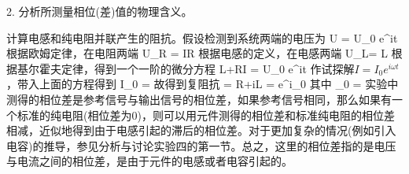 \documentclass[11pt,a4paper]{ctexart}
\begin{document}
2. 分析所测量相位(差)值的物理含义。

计算电感和纯电阻并联产生的阻抗。假设检测到系统两端的电压为
\beq
U = U_0 e^{i\omega t}
\eeq
根据欧姆定律，在电阻两端
\beq
U_R = IR
\eeq
根据电感的定义，在电感两端
\beq
U_L=  L 
\eeq
根据基尔霍夫定律，得到一个一阶的微分方程
\beq
L+RI = U_0 e^{i\omega t}
\eeq
作试探解$I = I_0 e^{i\omega t}$，带入上面的方程得到
\beq
I_0 = 
\eeq
故得到复阻抗
\beq
{} = R+i\omega L = e^{i\theta_0}
\eeq
其中
\beq
\tan\theta_0 = 
\eeq
实验中测得的相位差是参考信号与输出信号的相位差，如果参考信号相同，那么如果有一个标准的纯电阻(相位差为0)，则可以用元件测得的相位差和标准纯电阻的相位差相减，近似地得到由于电感引起的滞后的相位差。对于更加复杂的情况(例如引入电容)的推导，参见分析与讨论实验四的第一节。总之，这里的相位差指的是电压与电流之间的相位差，是由于元件的电感或者电容引起的。


\end{document}
